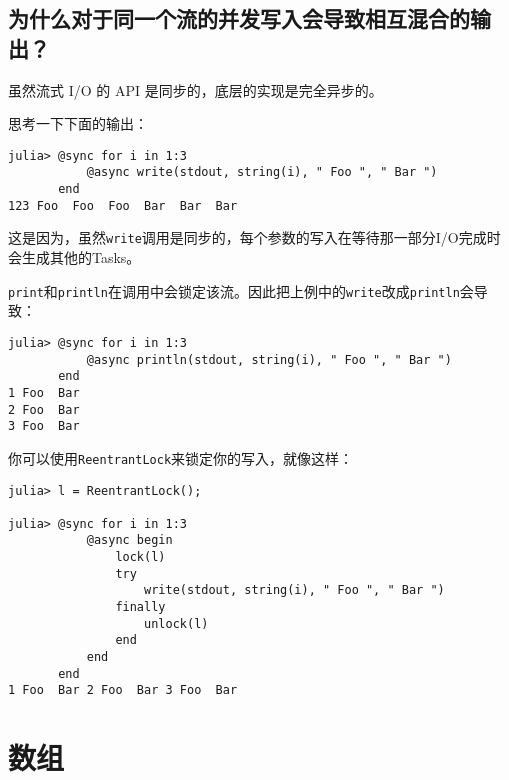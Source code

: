 \hypertarget{6102848140854273508}{}


\subsection{为什么对于同一个流的并发写入会导致相互混合的输出？}



虽然流式 I/O 的 API 是同步的，底层的实现是完全异步的。



思考一下下面的输出：




\begin{verbatim}
julia> @sync for i in 1:3
           @async write(stdout, string(i), " Foo ", " Bar ")
       end
123 Foo  Foo  Foo  Bar  Bar  Bar
\end{verbatim}



这是因为，虽然\texttt{write}调用是同步的，每个参数的写入在等待那一部分I/O完成时会生成其他的Tasks。



\texttt{print}和\texttt{println}在调用中会{\textquotedbl}锁定{\textquotedbl}该流。因此把上例中的\texttt{write}改成\texttt{println}会导致：




\begin{verbatim}
julia> @sync for i in 1:3
           @async println(stdout, string(i), " Foo ", " Bar ")
       end
1 Foo  Bar
2 Foo  Bar
3 Foo  Bar
\end{verbatim}



你可以使用\texttt{ReentrantLock}来锁定你的写入，就像这样：




\begin{verbatim}
julia> l = ReentrantLock();

julia> @sync for i in 1:3
           @async begin
               lock(l)
               try
                   write(stdout, string(i), " Foo ", " Bar ")
               finally
                   unlock(l)
               end
           end
       end
1 Foo  Bar 2 Foo  Bar 3 Foo  Bar
\end{verbatim}



\hypertarget{11524621654961197830}{}


\section{数组}



